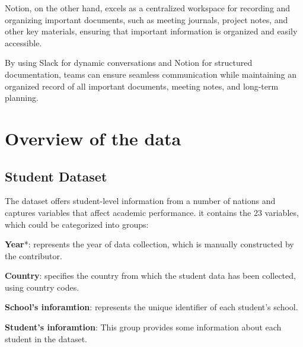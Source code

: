 \documentclass[
  11pt,
  a4paper,
]{article}
\begin{document}
Notion, on the other hand, excels as a centralized workspace for
recording and organizing important documents, such as meeting journals,
project notes, and other key materials, ensuring that important
information is organized and easily accessible.

By using Slack for dynamic conversations and Notion for structured
documentation, teams can ensure seamless communication while maintaining
an organized record of all important documents, meeting notes, and
long-term planning.

\section{Overview of the data}\label{overview-of-the-data}

\subsection{Student Dataset}\label{student-dataset}

The dataset offers student-level information from a number of nations
and captures variables that affect academic performance. it contains the
23 variables, which could be categorized into groups:

\textbf{Year}*: represents the year of data collection, which is
manually constructed by the contributor.

\textbf{Country}: specifies the country from which the student data has
been collected, using country codes.

\textbf{School's inforamtion}: represents the unique identifier of each
student's school.

\textbf{Student's inforamtion}: This group provides some information
about each student in the dataset.
\end{document}
